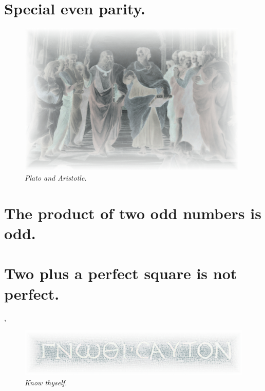 \documentclass[preview]{standalone}
\begin{document}
\section{Special even parity.}

\begin{figure}[h!]
    \centering
    \includegraphics[width=11cm]{../resources/jpg/1.6.introduction.to.proofs/plato-republic.jpg}
    \caption*{\emph{Plato and Aristotle.}}
\end{figure} 


\section{The product of two odd numbers is odd.}

\pagebreak


\section{Two plus a perfect square is not perfect.}

\sep
\begin{figure}[h!]
    \centering
    \includegraphics[width=13cm]{../resources/jpg/1.6.introduction.to.proofs/know_thyself.jpg}
    \caption*{\emph{Know thyself.}}
\end{figure} 
\pagebreak
\end{document}
